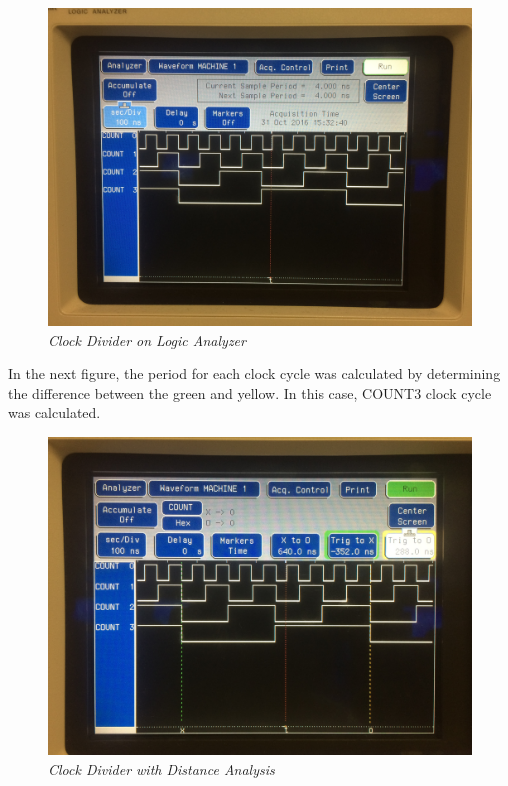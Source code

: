 \documentclass[a4paper,12pt]{article}
\begin{document}
  \newpage
   \begin{figure}[h]
    \begin{center}
      \includegraphics[scale=.08]{IMG_8620.JPG}
      \caption{\textit{Clock Divider on Logic Analyzer}}
    \end{center}
  \end{figure}
  
  In the next figure, the period for each clock cycle was calculated by determining the difference between the green and yellow. In this case, COUNT3 clock cycle was calculated. 
  
  \begin{figure}[h]
    \begin{center}
      \includegraphics[scale=.08]{IMG_8621.JPG}
      \caption{\textit{Clock Divider with Distance Analysis}}
    \end{center}
  \end{figure}
  \newpage
  
\end{document}

